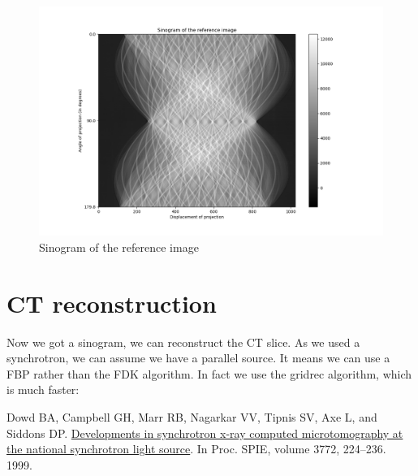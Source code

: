 \documentclass[11pt]{article}
\begin{document}
    \begin{figure}
\centering
\includegraphics{plots/Sinogram_reference_image.png}
\caption{Sinogram of the reference image}
\end{figure}

\hypertarget{ct-reconstruction}{%
\section{CT reconstruction}\label{ct-reconstruction}}

Now we got a sinogram, we can reconstruct the CT slice. As we used a
synchrotron, we can assume we have a parallel source. It means we can
use a FBP rather than the FDK algorithm. In fact we use the gridrec
algorithm, which is much faster:

Dowd BA, Campbell GH, Marr RB, Nagarkar VV, Tipnis SV, Axe L, and
Siddons DP. \href{https://doi.org/10.1117/12.363725}{Developments in
synchrotron x-ray computed microtomography at the national synchrotron
light source}. In Proc. SPIE, volume 3772, 224--236. 1999.
\end{document}
